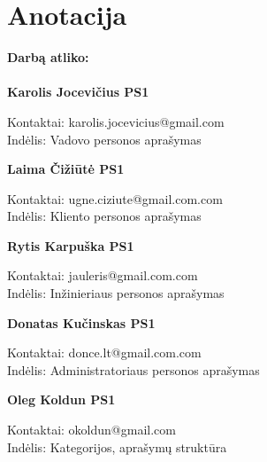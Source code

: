 

\newcommand{\anotacijaIndelis}[3]{
	\textbf{#1}
	\begin{flushleft}
	\hspace*{1cm}
	Kontaktai: #2
	\\
	\hspace*{1cm}
	Indėlis: #3
	\end{flushleft}
}

\newcommand{\anotacija}[2]{
	\textbf{#1}
	\begin{flushleft}
	\hspace*{1cm}
	Kontaktai: #2
	\end{flushleft}
}

\section*{Anotacija}
	
		\textbf{Darbą atliko:}\\\\
		
		\anotacijaIndelis{Karolis Jocevičius PS1}{karolis.jocevicius@gmail.com}{Vadovo personos aprašymas}
		
		\anotacijaIndelis{Laima Čižiūtė PS1}{ugne.ciziute@gmail.com.com}{Kliento personos aprašymas}
		
		\anotacijaIndelis{Rytis Karpuška PS1}{jauleris@gmail.com.com}{Inžinieriaus personos aprašymas}

		\anotacijaIndelis{Donatas Kučinskas PS1}{donce.lt@gmail.com.com}{Administratoriaus personos aprašymas}

		\anotacijaIndelis{Oleg Koldun PS1}{okoldun@gmail.com}{Kategorijos, aprašymų struktūra}